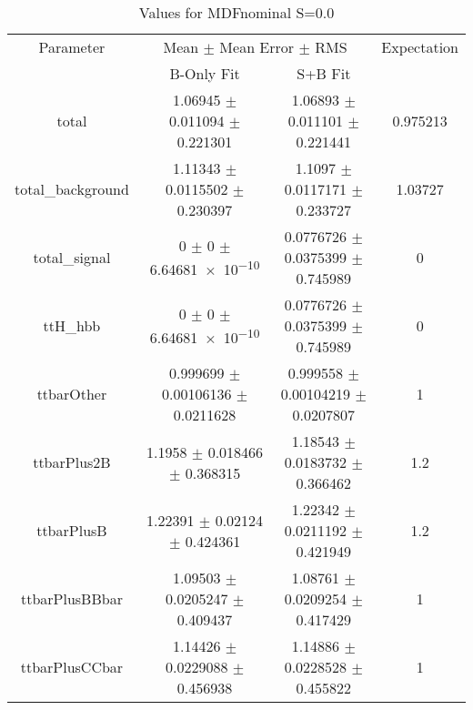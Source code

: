 \begin{table}
\centering
\caption{Values for MDFnominal S=0.0}
\begin{tabular}{cccc}
\toprule
Parameter & \multicolumn{2}{c}{Mean $\pm$ Mean Error $\pm$ RMS} & Expectation\\
 & B-Only Fit & S+B Fit & \\
\midrule
total & \num{1.06945} $\pm$ \num{0.011094} $\pm$ \num{0.221301} & \num{1.06893} $\pm$ \num{0.011101} $\pm$ \num{0.221441} & \num{0.975213}\\
total\_background & \num{1.11343} $\pm$ \num{0.0115502} $\pm$ \num{0.230397} & \num{1.1097} $\pm$ \num{0.0117171} $\pm$ \num{0.233727} & \num{1.03727}\\
total\_signal & \num{0} $\pm$ \num{0} $\pm$ \num{6.64681e-10} & \num{0.0776726} $\pm$ \num{0.0375399} $\pm$ \num{0.745989} & \num{0}\\
ttH\_hbb & \num{0} $\pm$ \num{0} $\pm$ \num{6.64681e-10} & \num{0.0776726} $\pm$ \num{0.0375399} $\pm$ \num{0.745989} & \num{0}\\
ttbarOther & \num{0.999699} $\pm$ \num{0.00106136} $\pm$ \num{0.0211628} & \num{0.999558} $\pm$ \num{0.00104219} $\pm$ \num{0.0207807} & \num{1}\\
ttbarPlus2B & \num{1.1958} $\pm$ \num{0.018466} $\pm$ \num{0.368315} & \num{1.18543} $\pm$ \num{0.0183732} $\pm$ \num{0.366462} & \num{1.2}\\
ttbarPlusB & \num{1.22391} $\pm$ \num{0.02124} $\pm$ \num{0.424361} & \num{1.22342} $\pm$ \num{0.0211192} $\pm$ \num{0.421949} & \num{1.2}\\
ttbarPlusBBbar & \num{1.09503} $\pm$ \num{0.0205247} $\pm$ \num{0.409437} & \num{1.08761} $\pm$ \num{0.0209254} $\pm$ \num{0.417429} & \num{1}\\
ttbarPlusCCbar & \num{1.14426} $\pm$ \num{0.0229088} $\pm$ \num{0.456938} & \num{1.14886} $\pm$ \num{0.0228528} $\pm$ \num{0.455822} & \num{1}\\
\bottomrule
\end{tabular}
\end{table}